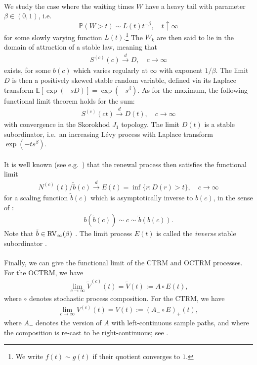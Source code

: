 \documentclass[12pt, a4paper]{article}
\newcommand{\PP}{\mathbb{P}}
\newcommand{\E}{\mathbb{E}}
\newcommand{\1}{\mathbf 1}
\newcommand{\cd}{\overset{d}{\longrightarrow}}
\begin{document}
\paragraph{}
We study the case where the waiting times $W$ have a heavy tail with
parameter $\beta \in (0,1)$, i.e.\ 
$$
\PP(W > t) \sim L(t) t^{-\beta}, \quad t \uparrow \infty
$$ 
for some slowly varying function $L(t)$.\footnote{
We write $f(t) \sim g(t)$ if their quotient converges to $1$.
}
The $W_k$ are then said to lie in the 
domain of attraction of a stable law, meaning that 
\begin{align}\label{eq:sclt}
S^{(c)}(c) \overset{d}{\longrightarrow} D, 
\quad c \to \infty
\end{align}
exists, for some $b(c)$ which varies regularly at $\infty$ with exponent 
$1/\beta$. 
The limit $D$ is then a positively skewed stable random variable, defined via
its Laplace transform $\E[\exp(-sD)] = \exp(-s^\beta)$.
As for the maximum, the following functional limit theorem holds for the sum:
\begin{align}
S^{(c)}(ct) \overset{d}{\longrightarrow} D(t), 
\quad c \to \infty
\end{align}
with convergence in the Skorokhod $J_1$ topology.
The limit $D(t)$ is a stable subordinator, i.e.\ an increasing
L\'evy process with Laplace transform $\exp(-t s^\beta)$.

\paragraph{}
It is well known (see e.g.\ \cite{limitCTRW}) that the renewal
process then satisfies the functional limit
\begin{align}
N^{(c)}(t)/\tilde b(c) \cd E(t) = \inf\{r: D(r) > t\}, 
\quad c \to \infty
\end{align}
for a scaling function $\tilde b(c)$ which is asymptotically inverse to $b(c)$, in the sense of \cite[p.20]{seneta}: 
\begin{align}\label{eq:tildeb}
b(\tilde b(c)) \sim c \sim \tilde b(b(c)).
\end{align}
Note that $\tilde b \in {\rm RV}_\infty(\beta)$ 
\cite{limitCTRW}.
The limit process $E(t)$ is called the \emph{inverse} stable
subordinator \cite{invSubord}.

\paragraph{}
Finally, we can give the functional limit of the CTRM and OCTRM processes. 
For the OCTRM, we have 
\begin{align}
  \lim \limits_{c \to \infty} \tilde V^{(c)}(t) = \tilde V(t) 
  := A \circ E(t),
\end{align}
where $\circ$ denotes stochastic process composition. For the CTRM, we have 
\begin{align}
\lim \limits_{c \to \infty} V^{(c)}(t) = V(t) 
:= (A_- \circ E)_+(t),
\end{align}
where $A_-$ denotes the version of $A$ with left-continuous sample paths, and 
where the composition is re-cast to be right-continuous; see \cite{Hees17}. 
\end{document}
